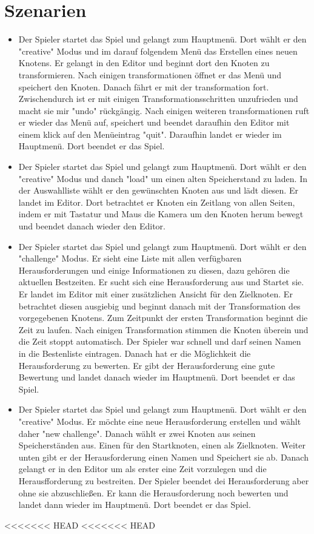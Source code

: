 	
\clearpage
	
\section{Szenarien}
\begin{itemize}	
\item Der Spieler startet das Spiel und gelangt zum Hauptmenü. Dort wählt er den "creative" Modus und im darauf folgendem Menü das Erstellen eines neuen Knotens. Er gelangt in den Editor und beginnt dort den Knoten zu transformieren. Nach einigen transformationen öffnet er das Menü und speichert den Knoten. Danach fährt er mit der transformation fort. Zwischendurch ist er mit einigen Transformationsschritten unzufrieden und macht sie mir "undo" rückgängig. Nach einigen weiteren transformationen ruft er wieder das Menü auf, speichert und beendet daraufhin den Editor mit einem klick auf den Menüeintrag "quit". Daraufhin landet er wieder im Hauptmenü. Dort beendet er das Spiel.

\item Der Spieler startet das Spiel und gelangt zum Hauptmenü. Dort wählt er den "creative" Modus und danch "load" um einen alten Speicherstand zu laden. In der Auswahlliste wählt er den gewünschten Knoten aus und lädt diesen. Er landet im Editor. Dort betrachtet er Knoten ein Zeitlang von allen Seiten, indem er mit Tastatur und Maus die Kamera um den Knoten herum bewegt und beendet danach wieder den Editor.

\item  Der Spieler startet das Spiel und gelangt zum Hauptmenü. Dort wählt er den "challenge" Modus. Er sieht eine Liste mit allen verfügbaren Herausforderungen und einige Informationen zu diesen, dazu gehören die aktuellen Bestzeiten. Er sucht sich eine Herausforderung aus und Startet sie. Er landet im Editor mit einer zusätzlichen Ansicht für den Zielknoten. Er betrachtet diesen ausgiebig und beginnt danach mit der Transformation des vorgegebenen Knotens. Zum Zeitpunkt der ersten Transformation beginnt die Zeit zu laufen. Nach einigen Transformation stimmen die Knoten überein und die Zeit stoppt automatisch. Der Spieler war schnell und darf seinen Namen in die Bestenliste eintragen. Danach hat er die Möglichkeit die Herausforderung zu bewerten. Er gibt der Herausforderung eine gute Bewertung und landet danach wieder im Hauptmenü. Dort beendet er das Spiel.

\item Der Spieler startet das Spiel und gelangt zum Hauptmenü. Dort wählt er den "creative" Modus. Er möchte eine neue Herausforderung erstellen und wählt daher "new challenge". Danach wählt er zwei Knoten aus seinen Speicherständen aus. Einen für den Startknoten, einen als Zielknoten. Weiter unten gibt er der Herausforderung einen Namen und Speichert sie ab. Danach gelangt er in den Editor um als erster eine Zeit vorzulegen und die Herausfforderung zu bestreiten. Der Spieler beendet dei Herausforderung aber ohne sie abzuschließen. Er kann die Herausforderung noch bewerten und landet dann wieder im Hauptmenü. Dort beendet er das Spiel.
\end{itemize}
<<<<<<< HEAD
<<<<<<< HEAD

